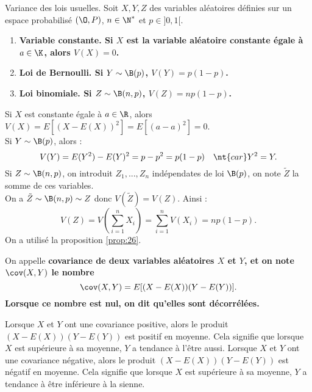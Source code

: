 \documentclass[11pt]{article}
\begin{document}
\begin{prop}{Variance des lois usuelles.}{}
    Soit $X,Y,Z$ des variables aléatoires définies sur un espace probabilisé $(\O,P)$, $n\in\N^*$ et $p\in]0,1[$.
    \begin{enumerate}[topsep=0pt,itemsep=-0.5 ex]
        \item \bf{Variable constante.} Si $X$ est la variable aléatoire constante égale à $a\in\K$, alors $\boxed{V(X)=0}$.
        \item \bf{Loi de Bernoulli.} Si $Y\sim\B(p)$, $\boxed{V(Y)=p(1-p)}$.
        \item \bf{Loi binomiale.} Si $Z\sim\B(n,p)$, $\boxed{V(Z)=np(1-p)}$.
    \end{enumerate}
    \tcblower
     Si $X$ est constante égale à $a\in\R$, alors $V(X)=E[(X-E(X))^2]=E[(a-a)^2]=0$.\\
     Si $Y\sim\B(p)$, alors :
    \begin{equation*}
        V(Y)=E(Y^2)-E(Y)^2=p-p^2=p(1-p) \quad \nt{car } Y^2=Y.
    \end{equation*}
     Si $Z\sim\B(n,p)$, on introduit $Z_1,...,Z_n$ indépendates de loi $\B(p)$, on note $\tilde{Z}$ la somme de ces variables.\\
    On a $\tilde{Z}\sim\B(n,p)\sim Z$ donc $V(\tilde{Z})=V(Z)$. Ainsi :
    \begin{equation*}
        V(Z)=V\left( \sum_{i=1}^n X_i \right) = \sum_{i=1}^n V(X_i) = np(1-p).
    \end{equation*}
    On a utilisé la proposition \ref{prop:26}.
\end{prop}

\begin{defi}{}{}
    On appelle \bf{covariance} de deux variables aléatoires $X$ et $Y$, et on note $\cov(X,Y)$ le nombre
    \begin{equation*}
        \cov(X,Y)=E[(X-E(X))(Y-E(Y))].
    \end{equation*}
    Lorsque ce nombre est nul, on dit qu'elles sont \bf{décorrélées}.
\end{defi}

\begin{inter}{}{}
    Lorsque $X$ et $Y$ ont une covariance positive, alors le produit $(X-E(X))(Y-E(Y))$ est positif en moyenne. Cela signifie que lorsque $X$ est supérieure à sa moyenne, $Y$ a tendance à l'être aussi.\n
    Lorsque $X$ et $Y$ ont une covariance négative, alors le produit $(X-E(X))(Y-E(Y))$ est négatif en moyenne. Cela signifie que lorsque $X$ est supérieure à sa moyenne, $Y$ a tendance à être inférieure à la sienne.
\end{inter}
\end{document}
